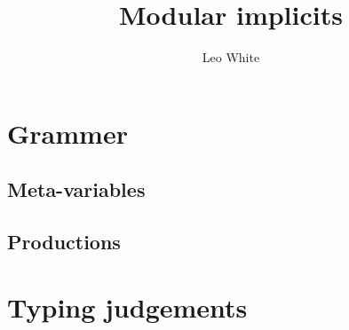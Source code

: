 \documentclass{article}
\title{Modular implicits}
\author{Leo White}
\date{}
\begin{document}
\maketitle
\section{Grammer}
\subsection{Meta-variables}
\ottmetavars
\subsection{Productions}
\ottgrammar
\section{Typing judgements}
\ottdefnsTyping
\end{document}
